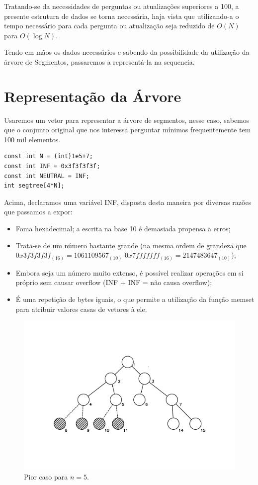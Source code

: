 Tratando-se da necessidades de perguntas ou atualizações superiores a 100, a presente estrutura de dados se torna necessária, haja vista que utilizando-a o tempo necessário para cada pergunta ou atualização seja reduzido de $O(N)$ para $O(\log N)$.

Tendo em mãos os dados necessários e sabendo da possibilidade da utilização da árvore de Segmentos, passaremos a representá-la na sequencia.

\section{Representação da Árvore}
Usaremos um vetor para representar a árvore de segmentos, nesse caso, sabemos
que o conjunto original que nos interessa perguntar mínimos frequentemente tem
100 mil elementos.

\begin{lstlisting}
const int N = (int)1e5+7;
const int INF = 0x3f3f3f3f;
const int NEUTRAL = INF;
int segtree[4*N];
\end{lstlisting}
Acima, declaramos uma variável INF, disposta desta maneira por diversas razões que passamos a expor:
\begin{itemize}
    \item Foma hexadecimal; a escrita na base 10 é demasiada propensa a erros;
    \item Trata-se de um número bastante grande (na mesma ordem de grandeza que $0x3f3f3f3f_{(16)} = 1061109567_{(10)}$ $0x7fffffff_{(16)} = 2147483647_{(10)}$);
    \item Embora seja um número muito extenso, é possível realizar operações em si próprio sem causar overflow (INF + INF = não causa overflow);
    \item É uma repetição de bytes iguais, o que permite a utilização da função memset para atribuir valores casas de vetores à ele.
\end{itemize}

\begin{figure}[!h]
\includegraphics[width=18cm]{figuras/fig1.pdf}
\caption{\label{fig:fig1}Pior caso para $n = 5$.}
\end{figure}

